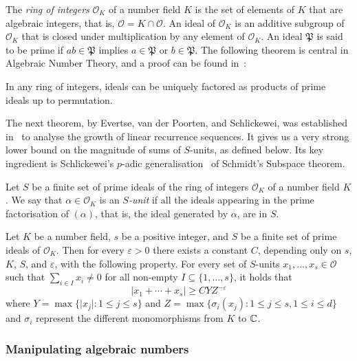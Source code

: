 The \emph{ring of integers} $\mathcal{O}_{K}$ of a number field $K$ is the set of elements of $K$ that are algebraic integers, that is, $\mathcal{O}=K\cap\mathcal{O}$.
An ideal of $\mathcal{O}_{K}$ is an additive subgroup of $\mathcal{O}_{K}$ that is closed under multiplication by any element of $\mathcal{O}_{K}$. An ideal $\mathfrak{P}$ is said to be prime if $ab\in \mathfrak{P}$ implies $a\in\mathfrak{P}$ or $b\in\mathfrak{P}$. The following theorem is central in Algebraic Number Theory, and a proof can be found in~\cite{SnT}:

\begin{theorem}
In any ring of integers, ideals can be uniquely factored as products of prime ideals up to permutation.
\end{theorem}

The next theorem, by Evertse, van der Poorten, and Schlickewei, was established in~\cite{Evertse84,PS82} to analyse the growth of linear recurrence sequences. It gives us a very strong lower bound on the magnitude of sums of $S$-units, as defined below. Its key ingredient is Schlickewei's $p$-adic generalisation~\cite{Sch77} of Schmidt's Subspace theorem.

Let $S$ be a finite set of prime ideals of the ring of integers
$\mathcal{O}_{K}$ of a number field $K$. We say that
$\alpha \in \mathcal{O}_{K}$ is an \emph{$S$-unit} if all the ideals
appearing in the prime factorisation of $(\alpha)$, that is, the ideal generated by $\alpha$, are in $S$.

\begin{theorem}[$S$-units]
\label{thm:s-units}
Let $K$ be a number field, $s$ be a positive integer, and $S$ be a
finite set of prime ideals of $\mathcal{O}_{K}$. Then for every
$\varepsilon>0$ there exists a constant $C$, depending only on $s$,
$K$, $S$, and $\varepsilon$, with the following property. For every
set of $S$-units $x_1,\ldots,x_s\in\mathcal{O}$ such that
$\sum\limits_{i\in I} x_i\neq 0$ for all non-empty $I\subseteq\lbrace
1,\ldots,s\rbrace$, it holds that
\[ \lvert x_1+\cdots+x_s \rvert\geq CYZ^{-\varepsilon} \]
where $Y=\max\lbrace \lvert x_j\rvert : 1\leq j\leq s \rbrace$ and $Z=\max\lbrace \sigma_i(x_j): 1\leq j\leq s,1\leq i\leq d \rbrace$ and $\sigma_i$ represent the different monomorphisms from $K$ to $\mathbb{C}$.
\end{theorem}

\subsubsection{Manipulating algebraic numbers}
\label{sec:alg_num_rep}

